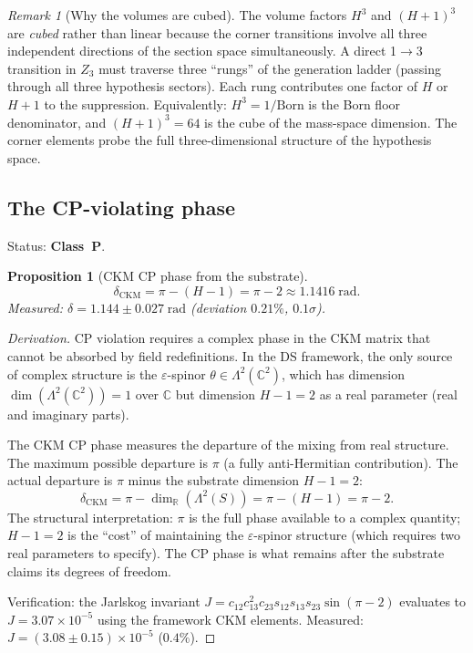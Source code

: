 \documentclass[11pt,a4paper]{article}
\newtheorem{proposition}[theorem]{Proposition}
\theoremstyle{definition}
\theoremstyle{remark}
\newtheorem{remark}[theorem]{Remark}
\newcommand{\C}{\mathbb{C}}
\newcommand{\R}{\mathbb{R}}
\newcommand{\Born}{\mathrm{Born}}
\begin{document}
\begin{remark}[Why the volumes are cubed]\label{rem:cubed}
The volume factors $H^3$ and $(H+1)^3$ are \emph{cubed} rather than linear because the corner transitions involve all three independent directions of the section space simultaneously. A direct 1$\to$3 transition in $Z_3$ must traverse three ``rungs'' of the generation ladder (passing through all three hypothesis sectors). Each rung contributes one factor of $H$ or $H+1$ to the suppression. Equivalently: $H^3 = 1/\Born$ is the Born floor denominator, and $(H+1)^3 = 64$ is the cube of the mass-space dimension. The corner elements probe the full three-dimensional structure of the hypothesis space.
\end{remark}


\subsection{The CP-violating phase}\label{sec:cp_phase}

Status: \textbf{Class~P}.

\begin{proposition}[CKM CP phase from the substrate]\label{prop:ckm_cp}
\begin{equation}\label{eq:delta_ckm}
\delta_{\mathrm{CKM}} = \pi - (H-1) = \pi - 2 \approx 1.1416\;\mathrm{rad}.
\end{equation}
Measured: $\delta = 1.144 \pm 0.027\;\mathrm{rad}$ (deviation $0.21\%$, $0.1\sigma$).
\end{proposition}

\begin{proof}[Derivation]
CP violation requires a complex phase in the CKM matrix that cannot be absorbed by field redefinitions. In the DS framework, the only source of complex structure is the $\varepsilon$-spinor $\theta \in \Lambda^2(\C^2)$, which has dimension $\dim(\Lambda^2(\C^2)) = 1$ over $\C$ but dimension $H-1 = 2$ as a real parameter (real and imaginary parts).

The CKM CP phase measures the departure of the mixing from real structure. The maximum possible departure is $\pi$ (a fully anti-Hermitian contribution). The actual departure is $\pi$ minus the substrate dimension $H-1 = 2$:
\[
\delta_{\mathrm{CKM}} = \pi - \dim_{\R}(\Lambda^2(S)) = \pi - (H-1) = \pi - 2.
\]
The structural interpretation: $\pi$ is the full phase available to a complex quantity; $H-1 = 2$ is the ``cost'' of maintaining the $\varepsilon$-spinor structure (which requires two real parameters to specify). The CP phase is what remains after the substrate claims its degrees of freedom.

Verification: the Jarlskog invariant $J = c_{12}c_{13}^2 c_{23} s_{12} s_{13} s_{23} \sin(\pi-2)$ evaluates to $J = 3.07 \times 10^{-5}$ using the framework CKM elements. Measured: $J = (3.08 \pm 0.15) \times 10^{-5}$ ($0.4\%$).
\end{proof}
\end{document}

